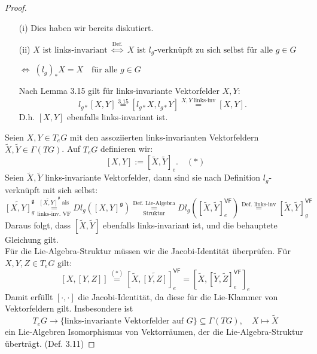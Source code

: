 \documentclass[fleqn, 12pt, letterpaper]{article}
\newcommand{\txt}[1]{\text{#1}}
\begin{document}
\begin{proof}
\quad
    \begin{itemize}
    \item[(i)] Dies haben wir bereits diskutiert.
    
    \item[(ii)] 
    \(
    X \text{ ist links-invariant} \; \overset{\txt{Def.}}{\Longleftrightarrow} \; X \text{ ist } l_g \text{-verknüpft zu sich selbst für alle } g \in G
    \)

    \(\Longleftrightarrow\; (l_g)_*X=X \quad \txt{für alle } g\in G \)
    
    Nach Lemma 3.15 gilt für links-invariante Vektorfelder \( X, Y \):
    \[
    l_{g*}[X, Y] \overset{3.15}{=} [l_{g*}X, l_{g*}Y] \overset{X, Y\;\txt{links-inv}}{=} [X, Y].
    \]
    D.h. \( [X, Y] \) ebenfalls links-invariant ist.\\
\end{itemize}
Seien \( X, Y \in T_e G \) mit den assoziierten links-invarianten Vektorfeldern \( \tilde{X}, \tilde{Y} \in \Gamma(TG) \). Auf \( T_e G \) definieren wir:
\[
[X, Y] := [\tilde{X}, \tilde{Y}]_e. \quad (*)
\]
Seien \( \tilde{X}, \tilde{Y} \) links-invariante Vektorfelder, dann sind sie nach Definition \( l_g \)-verknüpft mit sich selbst:
\[
\widetilde{[X, Y]}_g^{\mathfrak{g}} \underset{\txt{links-inv. VF}}{\overset{\widetilde{[X, Y]}^{\mathfrak{g}}\;\txt{als}}{=}} Dl_g \left([X, Y]^{\mathfrak{g}}\right) \underset{\txt{Struktur}}{\overset{\txt{Def. Lie-Algebra}}{=}} Dl_g \left([\widetilde{X}, \widetilde{Y}]_e^{\mathsf{VF}}\right) \overset{\txt{Def. links-inv}}{=} [\widetilde{X}, \widetilde{Y}]_g^{\mathsf{VF}}
\]
Daraus folgt, dass \( [\tilde{X}, \tilde{Y}] \) ebenfalls links-invariant ist, und die behauptete Gleichung gilt.\\

Für die Lie-Algebra-Struktur müssen wir die Jacobi-Identität überprüfen. Für \( X, Y, Z \in T_e G \) gilt:
\[
\left[X, [Y, Z]\right] \overset{(*)}{=} [\widetilde{X}, \widetilde{[Y, Z]}]^{\mathsf{VF}}_e 
= \left[\widetilde{X}, [\widetilde{Y}, \widetilde{Z}]_e^{\mathsf{VF}}\right]_e
\]
Damit erfüllt \( [\cdot, \cdot] \) die Jacobi-Identität, da diese für die Lie-Klammer von Vektorfeldern gilt. Insbesondere ist 
\[
T_e G \longrightarrow \{ \text{links-invariante Vektorfelder auf } G \} \subseteq \Gamma(TG), \quad X \longmapsto \tilde{X}
\]
ein Lie-Algebren Isomorphismus von Vektorräumen, der die Lie-Algebra-Struktur überträgt. (Def. 3.11)
\end{proof}
\end{document}
